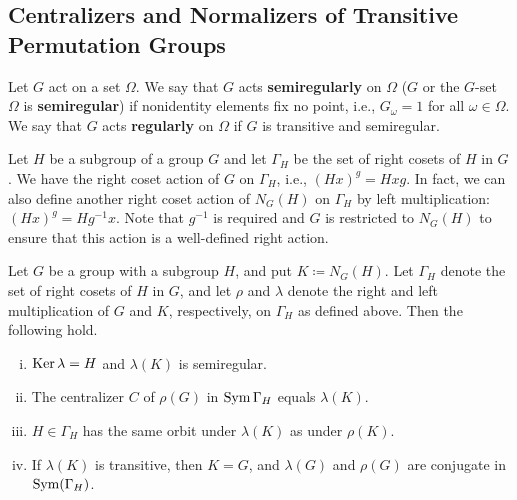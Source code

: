 \subsection{Centralizers and Normalizers of Transitive Permutation Groups}
\begin{definition}
	Let $G$ act on a set $\Omega$. We say that $G$ acts \textbf{semiregularly} on $\Omega$ ($G$ or the $G$-set $\Omega$ is \textbf{semiregular}) if nonidentity elements fix no point, i.e., $G_\omega = 1$ for all $\omega\in\Omega$. We say that $G$ acts \textbf{regularly} on $\Omega$ if $G$ is transitive and semiregular.
\end{definition}
Let $H$ be a subgroup of a group $G$ and let $\Gamma_H$ be the set of right cosets of $H$ in $G$. We have the right coset action of $G$ on $\Gamma_H$, i.e., $(Hx)^g = Hxg$. In fact, we can also define another right coset action of $N_G(H)$ on $\Gamma_H$ by left multiplication: $(Hx)^g = Hg^{-1}x$. Note that $g^{-1}$ is required and $G$ is restricted to $N_G(H)$ to ensure that this action is a well-defined right action.
\begin{lemma} \label{lemma-left-right-mult}
	Let $G$ be a group with a subgroup $H$, and put $K \coloneq  N_G(H)$. Let $\Gamma_H$ denote the set of right cosets of $H$ in $G$, and let $\rho$ and $\lambda$ denote the right and left multiplication of $G$ and $K$, respectively, on $\Gamma_H$ as defined above. Then the following hold.
\begin{enumerate}[(i)]
\item $\operatorname{Ker} \lambda = H$ and $\lambda(K)$ is semiregular.
\item The centralizer $C$ of $\rho(G)$ in $\operatorname{Sym}\Gamma_H$ equals $\lambda(K)$.
\item $H \in \Gamma_H$ has the same orbit under $\lambda(K)$ as under $\rho(K)$.
\item If $\lambda(K)$ is transitive, then $K = G$, and $\lambda(G)$ and $\rho(G)$ are conjugate in $\operatorname{Sym}(\Gamma_H)$.
\end{enumerate}
\end{lemma}
